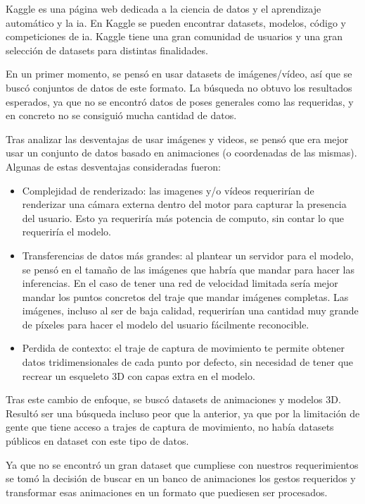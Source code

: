 Kaggle es una página web dedicada a la ciencia de datos y el aprendizaje automático y la \gls{ia}. En Kaggle se pueden encontrar datasets, modelos, código y competiciones de \gls{ia}. Kaggle tiene una gran comunidad de usuarios y una gran selección de datasets para distintas finalidades.

En un primer momento, se pensó en usar datasets de imágenes/vídeo, así que se buscó conjuntos de datos de este formato. La búsqueda no obtuvo los resultados esperados, ya que no se encontró datos de poses generales como las requeridas, y en concreto no se consiguió mucha cantidad de datos.

Tras analizar las desventajas de usar imágenes y videos, se pensó que era mejor usar un conjunto de datos basado en animaciones (o coordenadas de las mismas). Algunas de estas desventajas consideradas fueron:
\begin{itemize}
    \item Complejidad de renderizado: las imagenes y/o vídeos requerirían de renderizar una cámara externa dentro del motor para capturar la presencia del usuario. Esto ya requeriría más potencia de computo, sin contar lo que requeriría el modelo.
    \item Transferencias de datos más grandes: al plantear un servidor para el modelo, se pensó en el tamaño de las imágenes que habría que mandar para hacer las inferencias. En el caso de tener una red de velocidad limitada sería mejor mandar los puntos concretos del traje que mandar imágenes completas. Las imágenes, incluso al ser de baja calidad, requerirían una cantidad muy grande de píxeles para hacer el modelo del usuario fácilmente reconocible.
    \item Perdida de contexto: el traje de captura de movimiento te permite obtener datos tridimensionales de cada punto por defecto, sin necesidad de tener que recrear un esqueleto 3D con capas extra en el modelo.
\end{itemize}

Tras este cambio de enfoque, se buscó datasets de animaciones y modelos 3D. Resultó ser una búsqueda incluso peor que la anterior, ya que por la limitación de gente que tiene acceso a trajes de captura de movimiento, no había datasets públicos en dataset con este tipo de datos.

Ya que no se encontró un gran dataset que cumpliese con nuestros requerimientos se tomó la decisión de buscar en un banco de animaciones los gestos requeridos y transformar esas animaciones en un formato que puediesen ser procesados.